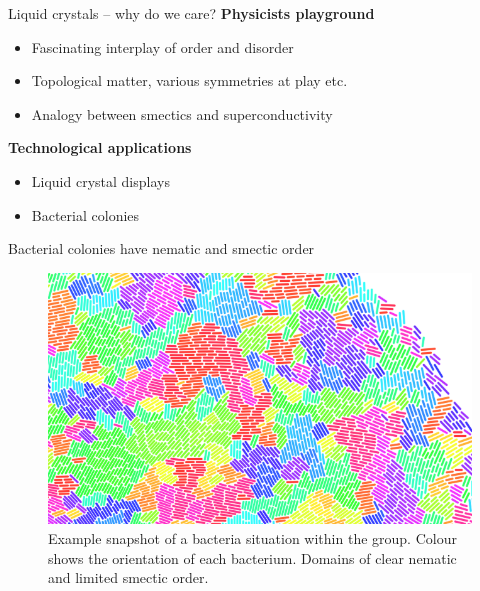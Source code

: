 \documentclass[10pt,notes]{beamer}
\newcommand{\subheading}[1]{\large\textbf{#1}\normalsize}
\begin{document}
\begin{frame}[fragile]{Liquid crystals -- why do we care?}
    \newrefsection
    \subheading{Physicists playground}
    \begin{itemize}
        \item Fascinating interplay of order and disorder
        \item Topological matter, various symmetries at play etc.
        \item Analogy between smectics and superconductivity\cite{degennesAnalogySuperconductorsSmectics1972}
    \end{itemize}
    \subheading{Technological applications}
    \begin{itemize}
        \item Liquid crystal displays
        \item Bacterial colonies
    \end{itemize}
    \vfill
    \printbibliography[heading=none]
    \vspace{-\fill}
\end{frame}

\begin{frame}[fragile]{Bacterial colonies have nematic and smectic order}
    \newrefsection
    \begin{figure}
        \centering
        \includegraphics[width=\textwidth]{figures/bio_laila1.png}
        \caption{
            Example snapshot of a bacteria situation within the group.
            Colour shows the orientation of each bacterium.
            Domains of clear nematic and limited smectic order.
        }
    \end{figure}
    \vfill
    \printbibliography[heading=none]
    \vspace{-\fill}
\end{frame}
\end{document}
